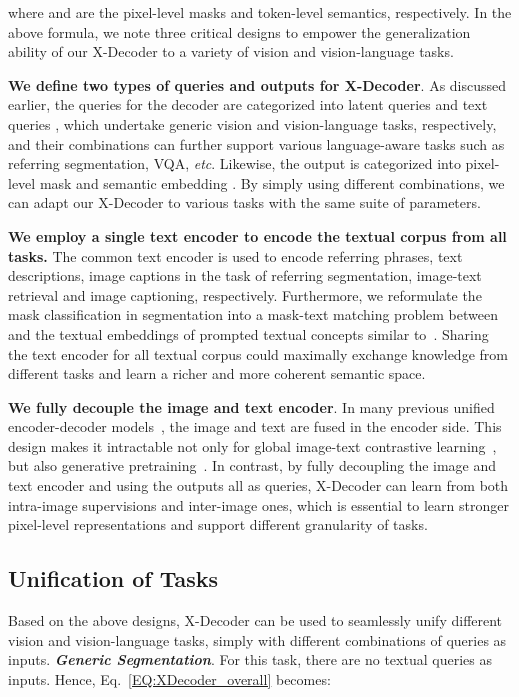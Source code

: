 \documentclass[10pt,twocolumn,letterpaper]{article}
\newcommand{\ourmodel}{X-Decoder}
\begin{document}
where  and  are the pixel-level masks and token-level semantics, respectively. In the above formula, we note three critical designs to empower the generalization ability of our \ourmodel{} to a variety of vision and vision-language tasks.

\smallskip
\noindent
\textbf{We define two types of queries and outputs for \ourmodel{}}. As discussed earlier, the queries for the decoder are categorized into latent queries  and text queries , which undertake generic vision and vision-language tasks, respectively, and their combinations can further support various language-aware tasks such as referring segmentation, VQA, \textit{etc}. Likewise, the output is categorized into pixel-level mask  and semantic embedding . By simply using different combinations, we can adapt our \ourmodel{} to various tasks with the same suite of parameters.

\noindent
\textbf{We employ a single text encoder  to encode the textual corpus from all tasks.} The common text encoder is used to encode referring phrases, text descriptions, image captions in the task of referring segmentation, image-text retrieval and image captioning, respectively. Furthermore, we reformulate the mask classification in segmentation into a mask-text matching problem between  and the textual embeddings of prompted textual concepts similar to~\cite{yang2022unified,ghiasi2021open}. Sharing the text encoder for all textual corpus could maximally exchange knowledge from different tasks and learn a richer and more coherent semantic space.

\noindent
\textbf{We fully decouple the image and text encoder}. In many previous unified encoder-decoder models~\cite{kamath2021mdetr,yang2022unitab,chen2022unified}, the image and text are fused in the encoder side. This design makes it intractable not only for global image-text contrastive learning~\cite{radford2021learning,yang2022unified}, but also generative pretraining~\cite{wang2022git}. In contrast, by fully decoupling the image and text encoder and using the outputs all as queries, \ourmodel{} can learn from both intra-image supervisions and inter-image ones, which is essential to learn stronger pixel-level representations and support different granularity of tasks.
\vspace{-2pt}

\subsection{Unification of Tasks}
\label{subsec:task_unification}
Based on the above designs, \ourmodel{} can be used to seamlessly unify different vision and vision-language tasks, simply with different combinations of queries as inputs.
\textit{\textbf{Generic Segmentation}}. For this task, there are no textual queries as inputs. Hence, Eq.~\eqref{EQ:XDecoder_overall} becomes:
    
\end{document}

